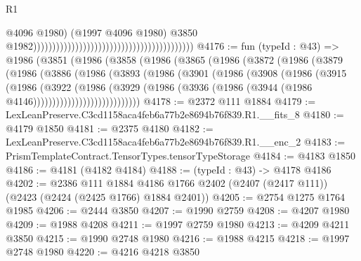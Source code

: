 \begin{lexlean}{R1}
\begin{coremodule}
                                                                                          @4096
                                                                                          @1980)
                                                                                        (@1997
                                                                                          @4096
                                                                                          @1980)
                                                                                        @3850
                                                                                        @1982))))))))))))))))))))))))))))))))))))))))))
@4176 := fun (typeId : @43) =>
  @1986
    (@3851
      (@1986
        (@3858
          (@1986
            (@3865
              (@1986
                (@3872
                  (@1986
                    (@3879
                      (@1986
                        (@3886
                          (@1986
                            (@3893
                              (@1986
                                (@3901
                                  (@1986
                                    (@3908
                                      (@1986
                                        (@3915
                                          (@1986
                                            (@3922
                                              (@1986
                                                (@3929
                                                  (@1986
                                                    (@3936
                                                      (@1986
                                                        (@3944
                                                          (@1986 @4146))))))))))))))))))))))))))))
@4178 := @2372 @111 @1884
@4179 := LexLeanPreserve.C3cd1158aca4feb6a77b2e8694b76f839.R1.__fits_8
@4180 := @4179 @1850
@4181 := @2375 @4180
@4182 := LexLeanPreserve.C3cd1158aca4feb6a77b2e8694b76f839.R1.__enc_2
@4183 := PrismTemplateContract.TensorTypes.tensorTypeStorage
@4184 := @4183 @1850
@4186 := @4181 (@4182 @4184)
@4188 := (typeId : @43) -> @4178 @4186
@4202 := @2386
    @111
    @1884
    @4186
    @1766
    @2402
    (@2407 (@2417 @111))
    (@2423 (@2424 (@2425 @1766) @1884 @2401))
@4205 := @2754 @1275 @1764 @1985
@4206 := @2444 @3850
@4207 := @1990 @2759
@4208 := @4207 @1980
@4209 := @1988 @4208
@4211 := @1997 @2759 @1980
@4213 := @4209 @4211 @3850
@4215 := @1990 @2748 @1980
@4216 := @1988 @4215
@4218 := @1997 @2748 @1980
@4220 := @4216 @4218 @3850

\end{coremodule}
\end{lexlean}
